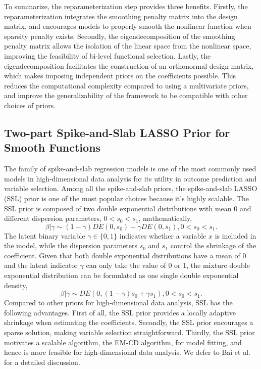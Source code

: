 \documentclass[AMA,STIX1COL,]{WileyNJD-v2}
\begin{document}
To summarize, the reparameterization step provides three benefits.
Firstly, the reparameterization integrates the smoothing penalty matrix
into the design matrix, and encourages models to properly smooth the
nonlinear function when sparsity penalty exists. Secondly, the
eigendecomposition of the smoothing penalty matrix allows the isolation
of the linear space from the nonlinear space, improving the feasibility
of bi-level functional selection. Lastly, the eigendecomposition
facilitates the construction of an orthonormal design matrix, which
makes imposing independent priors on the coefficients possible. This
reduces the computational complexity compared to using a multivariate
priors, and improve the generalizability of the framework to be
compatible with other choices of priors.

\subsection{Two-part Spike-and-Slab LASSO Prior for Smooth Functions}\label{sec:method_prior}

The family of spike-and-slab regression models is one of the most
commonly used models in high-dimensional data analysis for its utility
in outcome prediction and variable selection. Among all the
spike-and-slab priors, the spike-and-slab LASSO (SSL) prior
\cite{Rockova2018b, Rockova2018} is one of the most popular choices
because it's highly scalable. The SSL prior is composed of two double
exponential distributions with mean 0 and different dispersion
parameters, \(0 < s_0 < s_1\), mathematically, \begin{equation} 
\beta | \gamma \sim (1-\gamma)DE(0, s_0) + \gamma DE(0, s_1), 0 < s_0 < s_1.\nonumber
\end{equation} The latent binary variable \(\gamma \in \{0,1\}\)
indicates whether a variable \(x\) is included in the model, while the
dispersion parameters \(s_0\) and \(s_1\) control the shrinkage of the
coefficient. Given that both double exponential distributions have a
mean of 0 and the latent indicator \(\gamma\) can only take the value of
0 or 1, the mixture double exponential distribution can be formulated as
one single double exponential density, \begin{equation} \label{eq:ssl}
\beta | \gamma \sim DE(0, (1-\gamma)s_0 + \gamma s_1), 0 < s_0 < s_1.
\end{equation} Compared to other priors for high-dimensional data
analysis, SSL has the following advantages. First of all, the SSL prior
provides a locally adaptive shrinkage when estimating the coefficients.
Secondly, the SSL prior encourages a sparse solution, making variable
selection straightforward. Thirdly, the SSL prior motivates a scalable
algorithm, the EM-CD algorithm, for model fitting, and hence is more
feasible for high-dimensional data analysis. We defer to Bai et
al.~\cite{Bai2021Review} for a detailed discussion.
\end{document}
